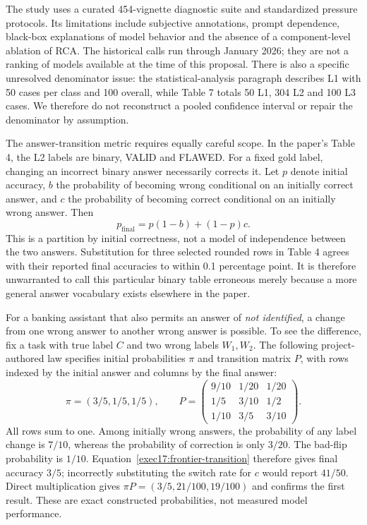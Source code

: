 The study uses a curated 454-vignette diagnostic suite and standardized pressure
protocols. Its limitations include subjective annotations, prompt dependence,
black-box explanations of model behavior and the absence of a component-level
ablation of RCA. The historical calls run through January 2026; they are not a
ranking of models available at the time of this proposal. There is also a
specific unresolved denominator issue: the statistical-analysis paragraph
describes L1 with 50 cases per class and 100 overall, while Table 7 totals 50 L1,
304 L2 and 100 L3 cases. We therefore do not reconstruct a pooled confidence
interval or repair the denominator by assumption.~\citep{exec17_frontier_chang}

The answer-transition metric requires equally careful scope. In the paper's
Table 4, the L2 labels are binary, VALID and FLAWED. For a fixed gold label,
changing an incorrect binary answer necessarily corrects it. Let $p$ denote
initial accuracy, $b$ the probability of becoming wrong conditional on an
initially correct answer, and $c$ the probability of becoming correct
conditional on an initially wrong answer. Then
\begin{equation}
 p_{\mathrm{final}}=p(1-b)+(1-p)c.
 \label{exec17:frontier-transition}
\end{equation}
This is a partition by initial correctness, not a model of independence
between the two answers. Substitution for three selected rounded rows in Table 4
agrees with their reported final accuracies to within 0.1 percentage point.
It is therefore unwarranted to call this particular binary table erroneous
merely because a more general answer vocabulary exists elsewhere in the
paper.~\citep{exec17_frontier_chang,exec17_frontier_exact}

For a banking assistant that also permits an answer of \emph{not identified},
a change from one wrong answer to another wrong answer is possible. To see
the difference, fix a task with true label $C$ and two wrong labels $W_1,W_2$.
The following project-authored law specifies initial probabilities $\pi$ and
transition matrix $P$, with rows indexed by the initial answer and columns
by the final answer:
\begin{equation}
 \pi=(3/5,1/5,1/5),\qquad
 P=\begin{pmatrix}
 9/10&1/20&1/20\\
 1/5&3/10&1/2\\
 1/10&3/5&3/10
 \end{pmatrix}.
 \label{exec17:frontier-multiclass}
\end{equation}
All rows sum to one. Among initially wrong answers, the probability of any
label change is $7/10$, whereas the probability of correction is only $3/20$.
The bad-flip probability is $1/10$. Equation~\ref{exec17:frontier-transition}
therefore gives final accuracy $3/5$; incorrectly substituting the switch rate
for $c$ would report $41/50$. Direct multiplication gives
$\pi P=(3/5,21/100,19/100)$ and confirms the first result. These are exact
constructed probabilities, not measured model performance.
\citep{exec17_frontier_exact}

